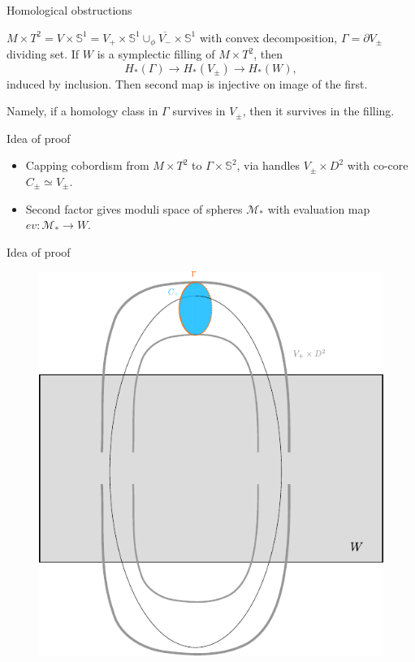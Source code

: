 \documentclass{beamer}
\begin{document}
\begin{frame}{Homological obstructions}
\begin{theorem}

$M \times T^2 =V\times \mathbb S^1=V_+\times \mathbb S^1\cup_\phi \overline{V_-}\times \mathbb S^1$ with convex decomposition, 
$\Gamma=\partial V_\pm$ dividing set. 
If $W$ is a symplectic filling of $M \times T^2$, then
$$
H_*(\Gamma)\rightarrow H_*(V_\pm) \rightarrow H_*(W),
$$
induced by inclusion. Then second map is injective on image of the first.
\end{theorem}

Namely, if a homology class in $\Gamma$ survives in $V_\pm$, then it survives in the filling.
    
\end{frame}

\begin{frame}{Idea of proof}
\begin{itemize}
\item Capping cobordism from $M\times T^2$ to $\Gamma\times \mathbb S^2$, via handles $V_\pm \times D^2$ with co-core $C_\pm \simeq V_\pm$. 
\pause
\item Second factor gives moduli space of spheres $\mathcal M_*$ with evaluation map $ev: \mathcal M_*\rightarrow W$. 
\end{itemize}
\end{frame}

\begin{frame}{Idea of proof}
    \begin{figure}
        \centering
        \includegraphics[width=.6\linewidth]{../images/obstruction_proof_sketch_no_homology.pdf}
    \end{figure}
\end{frame}
\end{document}
